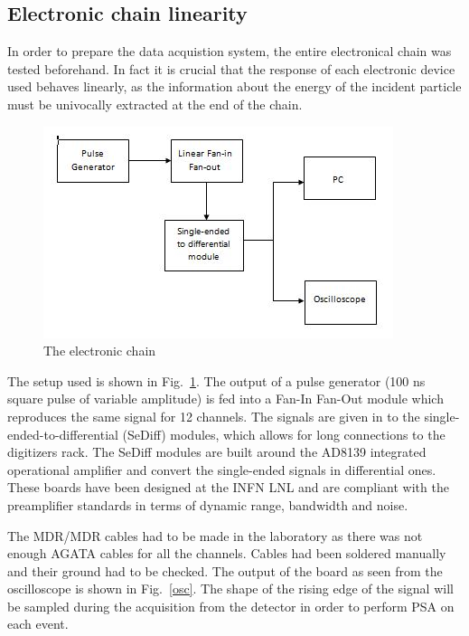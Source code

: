  \subsection{Electronic chain linearity}

In order to prepare the data acquistion system, the entire electronical chain
was tested beforehand. In fact it is crucial that the response of each
electronic device used behaves linearly, as the information about the energy
of the incident particle must be univocally extracted at the end of the chain.

\bigbreak

\begin{figure}[h]
  \centering
  \includegraphics[scale=.6]{img/electronic_chain_diagram.JPG}
  \caption{The electronic chain}
  \label{chain}
\end{figure}

\bigbreak

The setup used is shown in Fig.~\ref{chain}. The output of a pulse generator (\num{100} ns square pulse of variable amplitude) is fed into a Fan-In Fan-Out module which reproduces the same signal for 12 channels. The signals are given in
to the single-ended-to-differential (SeDiff) modules, which allows for long
connections to the digitizers rack. The SeDiff modules are built around the
AD8139 integrated operational amplifier and convert the single-ended signals
in differential ones. These boards have been designed at the INFN LNL and are
compliant with the preamplifier standards in terms of dynamic range, bandwidth
and noise.

\bigbreak

The MDR/MDR cables had to be made in the laboratory as there was not enough AGATA cables for all the channels. Cables had been soldered manually and their ground had to be checked.
The output of the board as seen from the oscilloscope is shown in Fig.~\ref{osc}. The shape of the rising edge of the signal will be sampled during the acquisition from the detector in order to perform PSA on each event.

